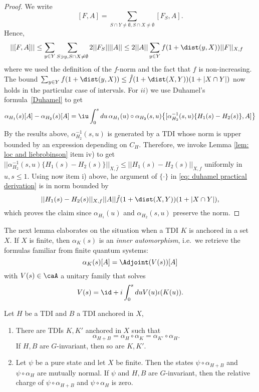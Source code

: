 \begin{proof}
	We write
	$$
	[F,A]=\sum_{S \cap Y \neq \emptyset, S \cap X \neq \emptyset }  [F_S,A].
	$$
	Hence,
	\begin{align*}
	||[F,A]|| &\leq \sum_{y\in Y}\sum_{S \ni y, S \cap X \neq \emptyset } 2 ||F_S|| ||A|| 
	\leq  2 ||A|| \sum_{y\in Y}  f(1+\dist(y,X)) ||F||_{X,f} 
	\end{align*}
	where we used the definition of the $f$-norm and the fact that $f$ is non-increasing. The bound $\sum_{y\in Y}  f(1+\dist(y,X))\leq\hat{f}(1+\dist(X,Y)) (1+|X\cap Y|)$ now holds in the particular case of intervals. 
	For $ii)$ we use Duhamel's formula~\eqref{Duhamel} to get
	\begin{equation}
	\alpha_{H_1}(s)[A]-\alpha_{H_2}(s) [A] 
	= \iu\int_0^s du \,   \alpha_{H_1}(u) \circ \alpha_{H_2}(s,u)  \big\{[ \alpha^{-1}_{H_2}(s,u)\{H_1(s)-H_2(s)\}, A]\big\}  \label{eq: duhamel practical derivation}
	\end{equation}
	By the results above, $\alpha^{-1}_{H_2}(s,u)$ is generated by a TDI whose norm is upper bounded by an expression depending on $C_H$. Therefore, we invoke Lemma \ref{lem: loc and liebrobinson} item iv) to get $|| \alpha^{-1}_{H_2}(s,u)\{H_1(s)-H_2(s)\} ||_{X,\hat{f}}\leq   ||H_1(s)-H_2(s) ||_{X,f} $ uniformly in $u,s \leq 1$. 
	Using now item i) above, he argument of $\{\cdot\} $ in \eqref{eq: duhamel practical derivation} is in norm bounded by 
	$$
	||H_1(s)-H_2(s) ||_{X,f}  ||A|| \hat{f}(1+\dist(X,Y)) (1+|X\cap Y|),
	$$
	which proves the claim since $\alpha_{H_1}(u)$ and $ \alpha_{H_2}(s,u)$ preserve the norm.
\end{proof}
The next lemma elaborates on the situation when a TDI $K$ is anchored in a set $X$.   If $X$ is finite, then $\alpha_K(s)$ is an \emph{inner automorphism}, i.e.\ we retrieve the formulas familiar from finite quantum systems:
\begin{equation}\label{eq: finite tdi}
\alpha_K(s)[A]= \Adjoint(V(s))[A]
\end{equation}
with $V(s) \in \caA$ a unitary family that solves  
$$
V(s)=\id+i\int^s_0 du V(u)\iota(K(u)).
$$
\begin{lemma}\label{lem: local perturbation tdi}
	Let $H$ be a TDI and $B$ a TDI anchored in $X$, 
	\begin{enumerate}
		\item There are TDIs $K,K'$ anchored in $X$ such that 
		$$
		\alpha_{H+B}=\alpha_H \circ  \alpha_K =   \alpha_{K'} \circ  \alpha_H.
		$$
		If $H,B$ are $G$-invariant, then so are $K,K'$.  
		\item  Let $\psi$ be a pure state and let $X$ be finite. Then the states $\psi\circ\alpha_{H+B} $ and $\psi\circ \alpha_H$ are mutually normal. If $\psi$ and $H,B$ are $G$-invariant, then the relative charge of
		$\psi\circ\alpha_{H+B} $ and $\psi\circ \alpha_H$ is zero.
	\end{enumerate}
\end{lemma}
